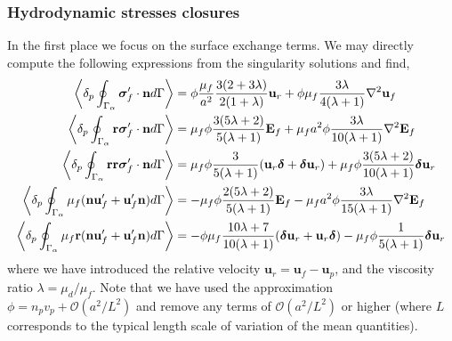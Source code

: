\subsubsection{Hydrodynamic stresses closures}
In the first place we focus on the surface exchange terms. 
We may directly compute the following expressions from the singularity solutions and find, 
\begin{align}
    \pSavg{\bm\sigma_f'\cdot \textbf{n}} &
    =
    \phi
    \frac{\mu_f}{a^2}
    \frac{3(2+3\lambda)}{2(1+\lambda)}\textbf{u}_r
    + \phi\mu_f  \frac{3\lambda}{4(\lambda +1)} \grad^2 \textbf{u}_f
    \label{eq:drag_forces}
    \\
    \pSavg{\textbf{r}\bm\sigma_f'\cdot \textbf{n}} &
    = \mu_f \phi 
    \frac{3(5\lambda +2)}{5(\lambda +1)}\textbf{E}_f
    + \mu_f a^2 \phi \frac{3\lambda}{10(\lambda+1)}\grad^2  \textbf{E}_f
    \\
    \pSavg{\textbf{rr}\bm\sigma_f'\cdot \textbf{n}} &
    =
    \mu_f \phi \frac{3}{5(\lambda +1)} (\textbf{u}_r \bm\delta + \bm\delta \textbf{u}_r)
    + \mu_f \phi \frac{3(5\lambda +2)}{10(\lambda+1)}\bm\delta \textbf{u}_r\\
    \pSavg{\mu_f (\textbf{n} \textbf{u}_f' + \textbf{u}_f' \textbf{n})}
    &=
    - \mu_f \phi \frac{2(5\lambda +2)}{5(\lambda+1)}\textbf{E}_f
    - \mu_f a^2 \phi \frac{3\lambda}{15(\lambda+1)}\grad^2  \textbf{E}_f
    \\
    \pSavg{\mu_f \textbf{r}(\textbf{n} \textbf{u}_f' + \textbf{u}_f' \textbf{n})}
    &=
    -\phi\mu_f \frac{10\lambda +7}{10(\lambda+1)}
    (\bm\delta \textbf{u}_r + \textbf{u}_r \bm\delta)
    -\mu_f \phi  \frac{1}{5(\lambda+1)}\bm\delta \textbf{u}_r
    \label{eq:secondUN}
\end{align}
where we have introduced the relative velocity $\textbf{u}_r = \textbf{u}_f - \textbf{u}_p$, and the viscosity ratio $\lambda = \mu_d/\mu_f$. 
Note that we have used the approximation $\phi=n_pv_p + \mathcal{O}(a^2/L^2)$ and remove any terms of $\mathcal{O}(a^2/L^2)$ or higher (where $L$ corresponds to the typical length  scale of variation of the mean quantities). 


